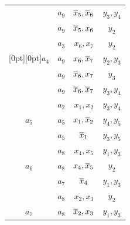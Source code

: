 \begin{table}
\begin{center}
\begin{minipage}[t]{190pt}
\begin{tabular}{|c|c|c|c|}


 & $a_9$ & $\overline x_5,\overline x_6$ & $y_3,y_4$\\




 & $a_9$ & $\overline x_5,x_6$ & $y_2$\\


\hline




 & $a_3$ & $x_6,x_7$ & $y_2$\\




\multicolumn{1}{|c|}{\raisebox{-6pt}[0pt][0pt]{$a_4$}} & $a_9$ & $x_6,\overline x_7$ & $y_2,y_3$\\




 & $a_9$ & $\overline x_6,x_7$ & $y_3$\\




 & $a_9$ & $\overline x_6,\overline x_7$ & $y_3,y_4$\\




\hline


  & $a_2$ & $x_1,x_2$ & $y_3,y_4$ \\




 $a_5$& $a_5$ & $x_1,\overline x_2$ & $y_4,y_5$ \\




 & $a_5$ & $\overline x_1$ & $y_3,y_5$ \\


\hline




  & $a_8$ & $x_4,x_5$ & $y_1,y_3$ \\




 $a_6$& $a_8$ & $x_4,\overline x_5$ & $y_2$ \\




 & $a_7$ & $\overline x_4$ & $y_1,y_3$ \\


\hline




  & $a_8$ & $x_2,x_3$ & $y_2$ \\




$a_7$ & $a_8$ & $\overline x_2,x_3$ & $y_1,y_3$ \\



\end{tabular}
\end{minipage}
\end{center}
\end{table}
